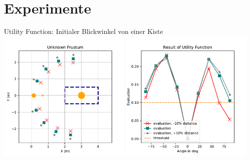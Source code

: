 \documentclass[aspectratio=169]{beamer}
\begin{document}
\section{Experimente}
\begin{frame}{Utility Function: Initialer Blickwinkel von einer Kiste}
	\centering
	\includegraphics[width=0.49\textwidth]{Graphics/crate_cands_first_unknown_1.pdf}
	\includegraphics[width=0.49\textwidth]{Graphics/crate_utility_first_unknown_1.pdf}
\end{frame}
\end{document}
